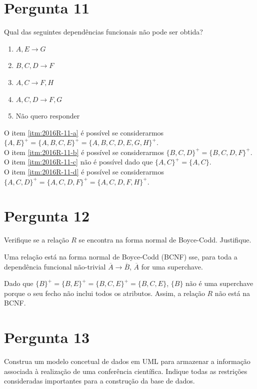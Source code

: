 \documentclass[type=recurso, year=2015/16]{bdad_exam}
\begin{document}
{\section{Pergunta 11}
Qual das seguintes dependências funcionais não pode ser obtida?
\begin{enumerate}[label=\alph*.]\itemsep0em
    \item \label{itm:2016R-11-a} $A, E \rightarrow G$
    \item \label{itm:2016R-11-b} $B, C, D \rightarrow F$
    \item \label{itm:2016R-11-c} $A,C \rightarrow F,H$
    \item \label{itm:2016R-11-d} $A,C,D \rightarrow F,G$
    \item \label{itm:2016R-11-e} Não quero responder
\end{enumerate}
O item \ref{itm:2016R-11-a} é possível se considerarmos $\{A,E\}^+ = \{A,B,C,E\}^+ = \{A,B,C,D,E,G,H\}^+$.\\
O item \ref{itm:2016R-11-b} é possível se considerarmos $\{B,C,D\}^+ = \{B,C,D,F\}^+$.\\
O item \ref{itm:2016R-11-c} não é possível dado que $\{A,C\}^+ = \{A,C\}$.\\
O item \ref{itm:2016R-11-d} é possível se considerarmos $\{A,C,D\}^+ = \{A,C,D,F\}^+ = \{A,C,D,F,H\}^+$.

\section{Pergunta 12}
Verifique se a relação $R$ se encontra na forma normal de Boyce-Codd. Justifique.

\ansseparator

Uma relação está na forma normal de Boyce-Codd (BCNF) sse, para toda a dependência funcional não-trivial $\overline{A} \rightarrow \overline{B}$, $\overline{A}$ for uma superchave.

Dado que $\{B\}^+ = \{B,E\}^+ = \{B,C,E\}^+ = \{B,C,E\}$, $\{B\}$ não é uma superchave porque o seu fecho não inclui todos os atributos. Assim, a relação $R$ não está na BCNF.

\newpage
\section{Pergunta 13}
Construa um modelo concetual de dados em UML para armazenar a informação associada à realização de uma conferência científica. Indique todas as restrições consideradas importantes para a construção da base de dados.

}
\end{document}
